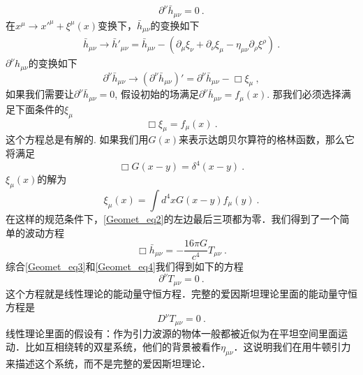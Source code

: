 \begin{equation}\label{Geomet_eq3}
\partial^\nu \bar h_{\mu\nu} = 0 ~. 
\end{equation}
在$x^\mu\rightarrow x'^\mu+\xi^\mu(x)$变换下，$\bar h_{\mu\nu}$的变换如下
\begin{align}
\bar h_{\mu\nu} \rightarrow \bar h'_{\mu\nu} = \bar h_{\mu\nu} - (\partial_\mu\xi_\nu+ \partial_\nu\xi_\mu - \eta_{\mu\nu} \partial_\rho\xi^\rho )~. 
\end{align}
$\partial^\nu h_{\mu\nu}$的变换如下
\begin{equation}
\partial^\nu \bar h_{\mu\nu} \rightarrow (\partial^\nu \bar h_{\mu\nu})' = \partial^\nu \bar h_{\mu\nu} - \Box \xi_\mu ~, 
\end{equation}
如果我们需要让$\partial^\nu \bar h_{\mu\nu} = 0$, 假设初始的场满足$\partial^\nu \bar h_{\mu\nu} = f_\mu (x)$. 那我们必须选择满足下面条件的$\xi_\mu$
\begin{equation}
\Box \xi_\mu = f_\mu (x) ~. 
\end{equation}
这个方程总是有解的. 如果我们用$G(x)$来表示达朗贝尔算符的格林函数，那么它将满足
\begin{equation}
\Box G(x-y) = \delta^4 (x-y) ~.
\end{equation}
$\xi_\mu(x)$的解为
\begin{equation}
\xi_\mu(x) = \int d^4 x G(x-y) f_\mu(y) ~.
\end{equation}
在这样的规范条件下，\autoref{Geomet_eq2}的左边最后三项都为零．我们得到了一个简单的波动方程
\begin{equation}\label{Geomet_eq4}
\Box \bar h_{\mu\nu} = - \frac{16\pi G}{c^4} T_{\mu\nu} ~. 
\end{equation}
综合\autoref{Geomet_eq3}和\autoref{Geomet_eq4}我们得到如下的方程
\begin{equation}
\partial^\nu T_{\mu\nu} = 0~.
\end{equation}
这个方程就是线性理论的能动量守恒方程．完整的爱因斯坦理论里面的能动量守恒方程是
\begin{equation}
D^\nu T_{\mu\nu} = 0 ~.
\end{equation}
线性理论里面的假设有：作为引力波源的物体一般都被近似为在平坦空间里面运动．比如互相绕转的双星系统，他们的背景被看作$\eta_{\mu\nu}$．这说明我们在用牛顿引力来描述这个系统，而不是完整的爱因斯坦理论．
